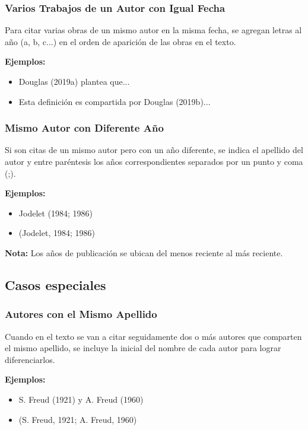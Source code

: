 \documentclass[aspectratio=169]{beamer}
\begin{document}
\begin{frame}
	\frametitle{Varios Trabajos de un Autor con Igual Fecha}
	Para citar varias obras de un mismo autor en la misma fecha, se agregan letras al año (a, b, c...) en el orden de aparición de las obras en el texto.
	
	\vspace{1em}
	
	\textbf{Ejemplos:}
	\begin{itemize}
		\item Douglas (2019a) plantea que...
		\item Esta definición es compartida por Douglas (2019b)...
	\end{itemize}
\end{frame}

\begin{frame}
	\frametitle{Mismo Autor con Diferente Año}
	Si son citas de un mismo autor pero con un año diferente, se indica el apellido del autor y entre paréntesis los años correspondientes separados por un punto y coma (;).
	
	\vspace{1em}
	
	\textbf{Ejemplos:}
	\begin{itemize}
		\item Jodelet (1984; 1986)
		\item (Jodelet, 1984; 1986)
	\end{itemize}
	
	\vspace{1em}
	
	\textbf{Nota:} Los años de publicación se ubican del menos reciente al más reciente.
\end{frame}

\subsection{Casos especiales}

\begin{frame}
	\frametitle{Autores con el Mismo Apellido}
	Cuando en el texto se van a citar seguidamente dos o más autores que comparten el mismo apellido, se incluye la inicial del nombre de cada autor para lograr diferenciarlos.
	
	\vspace{1em}
	
	\textbf{Ejemplos:}
	\begin{itemize}
		\item S. Freud (1921) y A. Freud (1960)
		\item (S. Freud, 1921; A. Freud, 1960)
	\end{itemize}
\end{frame}
\end{document}
